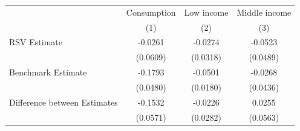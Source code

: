 \begin{threeparttable}
\begin{tabular}{l | ccc}
\toprule
& \multicolumn{1}{c}{Consumption} & \multicolumn{1}{c}{Low income} & \multicolumn{1}{c}{Middle income} \\
& (1) & (2) & (3) \\
\midrule
  RSV Estimate & -0.0261 & -0.0274 & -0.0523 \\
           & (0.0609) & (0.0318) & (0.0489) \\
\midrule
\addlinespace[0.3em]
  Benchmark Estimate & -0.1793 & -0.0501 & -0.0268 \\
           & (0.0480) & (0.0180) & (0.0436) \\
\midrule
  Difference between Estimates & -0.1532 & -0.0226 & 0.0255 \\
           & (0.0571) & (0.0282) & (0.0563) \\
\bottomrule
\end{tabular}
\end{threeparttable}
